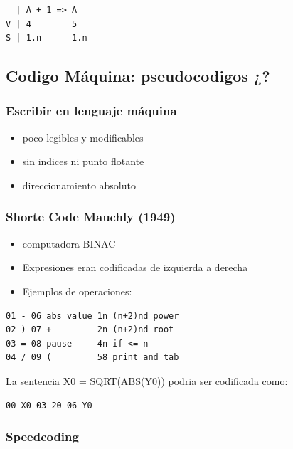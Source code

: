 \documentclass[11pt]{article}
\begin{document}
\begin{verbatim}
  | A + 1 => A
V | 4        5
S | 1.n      1.n
\end{verbatim}




\subsection*{Codigo Máquina: pseudocodigos ¿?}
\label{sec:orgheadline38}

\subsubsection*{Escribir en lenguaje máquina}
\label{sec:orgheadline34}

\begin{itemize}
\item poco legibles y modificables
\item sin indices ni punto flotante
\item direccionamiento absoluto
\end{itemize}

\subsubsection*{Shorte Code Mauchly (1949)}
\label{sec:orgheadline35}

\begin{itemize}
\item computadora BINAC
\item Expresiones eran codificadas de izquierda a derecha
\item Ejemplos de operaciones:
\end{itemize}

\begin{verbatim}
01 - 06 abs value 1n (n+2)nd power
02 ) 07 +         2n (n+2)nd root
03 = 08 pause     4n if <= n
04 / 09 (         58 print and tab
\end{verbatim}

La sentencia X0 = SQRT(ABS(Y0)) podria ser codificada como:

\begin{verbatim}
00 X0 03 20 06 Y0
\end{verbatim}

\subsubsection*{Speedcoding}
\label{sec:orgheadline36}
\end{document}
